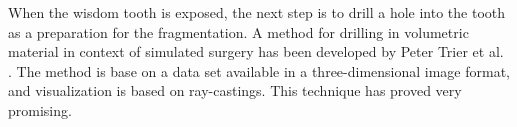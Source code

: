 When the wisdom tooth is exposed, the next step is to drill a hole into the
tooth as a preparation for the fragmentation.
A method for drilling in volumetric material in context of simulated
surgery has been developed by Peter Trier et al.
. The method is base on a data set 
available in a three-dimensional image format, and visualization is
based on ray-castings. This technique has proved very promising. \\

